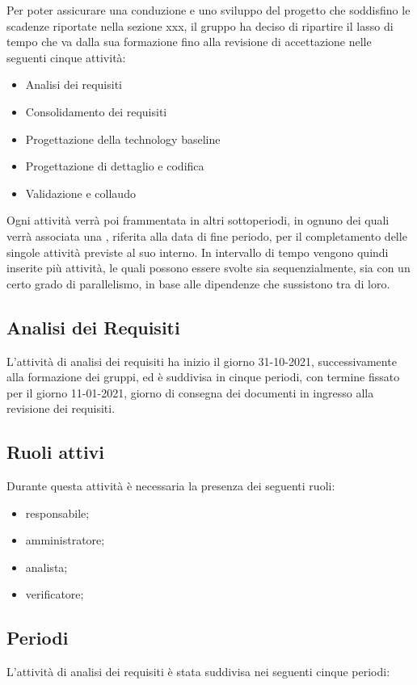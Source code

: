 Per poter assicurare una conduzione e uno sviluppo del progetto che soddisfino le scadenze riportate nella sezione xxx, il gruppo ha deciso di ripartire il lasso di tempo che va dalla sua formazione fino alla revisione di accettazione nelle seguenti cinque attività:
	
	\begin{itemize}
		\item Analisi dei requisiti
		\item Consolidamento dei requisiti
		\item Progettazione della technology baseline
		\item Progettazione di dettaglio e codifica
		\item Validazione e collaudo
	\end{itemize}
	
	Ogni attività verrà poi frammentata in altri sottoperiodi, in ognuno dei quali verrà associata una ,
	riferita alla data di fine periodo, per il completamento delle singole attività previste al suo interno.
	In intervallo di tempo vengono quindi inserite più attività, le quali possono essere svolte sia sequenzialmente,
	sia con un certo grado di parallelismo, in base alle dipendenze che sussistono tra di loro.
	
	\subsection{Analisi dei Requisiti}
	L’attività di analisi dei requisiti ha inizio il giorno 31-10-2021, successivamente alla formazione dei
	gruppi, ed è suddivisa in cinque periodi, con termine fissato per il giorno 11-01-2021, giorno di consegna dei documenti in ingresso alla revisione dei requisiti.
	
	\subsection{Ruoli attivi}
	Durante questa attività è necessaria la presenza dei seguenti ruoli:
	\begin{itemize}
		\item responsabile;
		\item amministratore;
		\item analista;
		\item verificatore;
	\end{itemize}

	\subsection{Periodi}
	L’attività di analisi dei requisiti è stata suddivisa nei seguenti cinque periodi:
	

